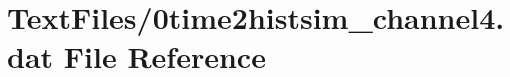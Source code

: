 \hypertarget{0time2histsim__channel4_8dat}{}\section{Text\+Files/0time2histsim\+\_\+channel4.dat File Reference}
\label{0time2histsim__channel4_8dat}
